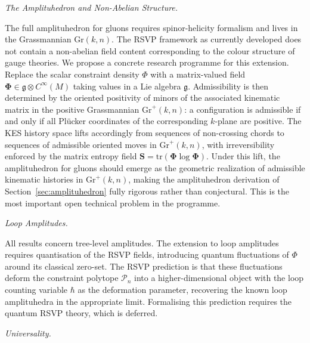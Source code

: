 \documentclass[11pt]{article}
\theoremstyle{plain}
\theoremstyle{definition}
\theoremstyle{remark}
\newcommand{\Gr}{\mathrm{Gr}}
\newcommand{\Phif}{\Phi}
\begin{document}
\medskip\noindent\textit{The Amplituhedron and Non-Abelian Structure.}

The full amplituhedron for gluons requires spinor-helicity formalism and lives in the Grassmannian $\Gr(k,n)$. The RSVP framework as currently developed does not contain a non-abelian field content corresponding to the colour structure of gauge theories. We propose a concrete research programme for this extension. Replace the scalar constraint density $\Phif$ with a matrix-valued field $\boldsymbol{\Phi} \in \mathfrak{g} \otimes C^\infty(M)$ taking values in a Lie algebra $\mathfrak{g}$. Admissibility is then determined by the oriented positivity of minors of the associated kinematic matrix in the positive Grassmannian $\mathrm{Gr}^+(k,n)$: a configuration is admissible if and only if all Pl\"{u}cker coordinates of the corresponding $k$-plane are positive. The KES history space lifts accordingly from sequences of non-crossing chords to sequences of admissible oriented moves in $\mathrm{Gr}^+(k,n)$, with irreversibility enforced by the matrix entropy field $\boldsymbol{S} = \mathrm{tr}(\boldsymbol{\Phi} \log \boldsymbol{\Phi})$. Under this lift, the amplituhedron for gluons should emerge as the geometric realization of admissible kinematic histories in $\mathrm{Gr}^+(k,n)$, making the amplituhedron derivation of Section~\ref{sec:amplituhedron} fully rigorous rather than conjectural. This is the most important open technical problem in the programme.

\medskip\noindent\textit{Loop Amplitudes.}

All results concern tree-level amplitudes. The extension to loop amplitudes requires quantisation of the RSVP fields, introducing quantum fluctuations of $\Phif$ around its classical zero-set. The RSVP prediction is that these fluctuations deform the constraint polytope $\mathcal{P}_n$ into a higher-dimensional object with the loop counting variable $\hbar$ as the deformation parameter, recovering the known loop amplituhedra in the appropriate limit. Formalising this prediction requires the quantum RSVP theory, which is deferred.

\medskip\noindent\textit{Universality.}
\end{document}
